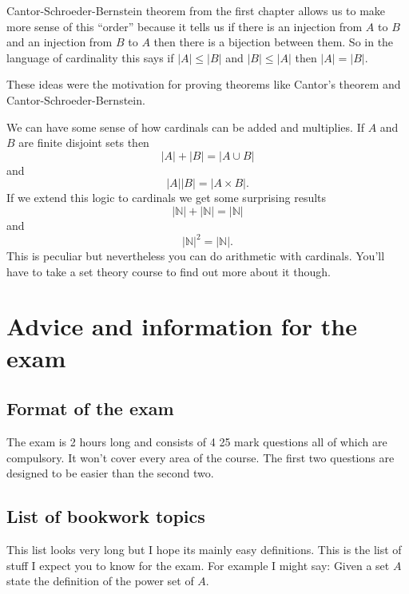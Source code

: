 \documentclass[
]{book}
\theoremstyle{definition}
\theoremstyle{definition}
\theoremstyle{definition}
\theoremstyle{definition}
\theoremstyle{remark}
\begin{document}
Cantor-Schroeder-Bernstein theorem from the first chapter allows us to make more sense of this ``order'' because it tells us if there is an injection from \(A\) to \(B\) and an injection from \(B\) to \(A\) then there is a bijection between them. So in the language of cardinality this says if \(|A| \leq |B|\) and \(|B| \leq |A|\) then \(|A| = |B|\).

These ideas were the motivation for proving theorems like Cantor's theorem and Cantor-Schroeder-Bernstein.

We can have some sense of how cardinals can be added and multiplies. If \(A\) and \(B\) are finite disjoint sets then
\[ |A| + |B| = |A \cup B|  \] and
\[|A| |B| = |A \times B|.  \]
If we extend this logic to cardinals we get some surprising results
\[ |\mathbb{N}| + |\mathbb{N}| = |\mathbb{N}| \] and
\[ |\mathbb{N}|^2 = |\mathbb{N}|. \]
This is peculiar but nevertheless you can do arithmetic with cardinals. You'll have to take a set theory course to find out more about it though.

\chapter{Advice and information for the exam}\label{advice-and-information-for-the-exam}

\section{Format of the exam}\label{format-of-the-exam}

The exam is 2 hours long and consists of 4 25 mark questions all of which are compulsory. It won't cover every area of the course. The first two questions are designed to be easier than the second two.

\section{List of bookwork topics}\label{list-of-bookwork-topics}

This list looks very long but I hope its mainly easy definitions. This is the list of stuff I expect you to know for the exam. For example I might say: Given a set \(A\) state the definition of the power set of \(A\).
\end{document}
